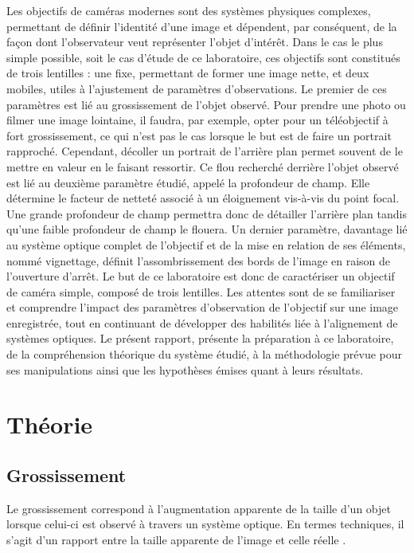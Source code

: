 \documentclass[11pt,letterpaper]{article}
\begin{document}
Les objectifs de caméras modernes sont des systèmes physiques complexes, permettant de définir l'identité d'une image et dépendent, par conséquent, de la façon dont l'observateur veut représenter l'objet d'intérêt. Dans le cas le plus simple possible, soit le cas d'étude de ce laboratoire, ces objectifs sont constitués de trois lentilles : une fixe, permettant de former une image nette, et deux mobiles, utiles à l'ajustement de paramètres d'observations. Le premier de ces paramètres est lié au grossissement de l'objet observé. Pour prendre une photo ou filmer une image lointaine, il faudra, par exemple, opter pour un téléobjectif à fort grossissement, ce qui n'est pas le cas lorsque le but est de faire un portrait rapproché. Cependant, décoller un portrait de l'arrière plan permet souvent de le mettre en valeur en le faisant ressortir. Ce flou recherché derrière l'objet observé est lié au deuxième paramètre étudié, appelé la profondeur de champ. Elle détermine le facteur de netteté associé à un éloignement vis-à-vis du point focal. Une grande profondeur de champ permettra donc de détailler l'arrière plan tandis qu'une faible profondeur de champ le flouera. Un dernier paramètre, davantage lié au système optique complet de l'objectif et de la mise en relation de ses éléments, nommé vignettage, définit l'assombrissement des bords de l'image en raison de l'ouverture d'arrêt. Le but de ce laboratoire est donc de caractériser un objectif de caméra simple, composé de trois lentilles. Les attentes sont de se familiariser et comprendre l'impact des paramètres d'observation de l'objectif sur une image enregistrée, tout en continuant de développer des habilités liée à l'alignement de systèmes optiques. Le présent rapport, présente la préparation à ce laboratoire, de la compréhension théorique du système étudié, à la méthodologie prévue pour ses manipulations ainsi que les hypothèses émises quant à leurs résultats. 

\section{Théorie}

\subsection{Grossissement}
Le grossissement correspond à l'augmentation apparente de la taille d'un objet lorsque celui-ci est observé à travers un système optique. En termes techniques, il s'agit d'un rapport entre la taille apparente de l'image et celle réelle \cite{blondeau_grossissement_2023}.
\end{document}
